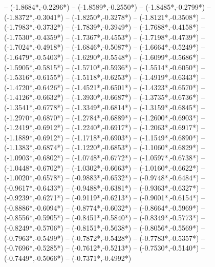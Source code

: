 {	-- ({-1.8684*\dx},{-0.2296*\dy})
	-- ({-1.8589*\dx},{-0.2550*\dy})
	-- ({-1.8485*\dx},{-0.2799*\dy})
	-- ({-1.8372*\dx},{-0.3041*\dy})
	-- ({-1.8250*\dx},{-0.3278*\dy})
	-- ({-1.8121*\dx},{-0.3508*\dy})
	-- ({-1.7983*\dx},{-0.3732*\dy})
	-- ({-1.7839*\dx},{-0.3949*\dy})
	-- ({-1.7688*\dx},{-0.4158*\dy})
	-- ({-1.7530*\dx},{-0.4359*\dy})
	-- ({-1.7367*\dx},{-0.4553*\dy})
	-- ({-1.7198*\dx},{-0.4739*\dy})
	-- ({-1.7024*\dx},{-0.4918*\dy})
	-- ({-1.6846*\dx},{-0.5087*\dy})
	-- ({-1.6664*\dx},{-0.5249*\dy})
	-- ({-1.6479*\dx},{-0.5403*\dy})
	-- ({-1.6290*\dx},{-0.5548*\dy})
	-- ({-1.6099*\dx},{-0.5686*\dy})
	-- ({-1.5905*\dx},{-0.5815*\dy})
	-- ({-1.5710*\dx},{-0.5936*\dy})
	-- ({-1.5514*\dx},{-0.6050*\dy})
	-- ({-1.5316*\dx},{-0.6155*\dy})
	-- ({-1.5118*\dx},{-0.6253*\dy})
	-- ({-1.4919*\dx},{-0.6343*\dy})
	-- ({-1.4720*\dx},{-0.6426*\dy})
	-- ({-1.4521*\dx},{-0.6501*\dy})
	-- ({-1.4323*\dx},{-0.6570*\dy})
	-- ({-1.4126*\dx},{-0.6632*\dy})
	-- ({-1.3930*\dx},{-0.6687*\dy})
	-- ({-1.3735*\dx},{-0.6736*\dy})
	-- ({-1.3541*\dx},{-0.6778*\dy})
	-- ({-1.3349*\dx},{-0.6814*\dy})
	-- ({-1.3159*\dx},{-0.6845*\dy})
	-- ({-1.2970*\dx},{-0.6870*\dy})
	-- ({-1.2784*\dx},{-0.6889*\dy})
	-- ({-1.2600*\dx},{-0.6903*\dy})
	-- ({-1.2419*\dx},{-0.6912*\dy})
	-- ({-1.2240*\dx},{-0.6917*\dy})
	-- ({-1.2063*\dx},{-0.6917*\dy})
	-- ({-1.1889*\dx},{-0.6912*\dy})
	-- ({-1.1718*\dx},{-0.6903*\dy})
	-- ({-1.1549*\dx},{-0.6890*\dy})
	-- ({-1.1383*\dx},{-0.6874*\dy})
	-- ({-1.1220*\dx},{-0.6853*\dy})
	-- ({-1.1060*\dx},{-0.6829*\dy})
	-- ({-1.0903*\dx},{-0.6802*\dy})
	-- ({-1.0748*\dx},{-0.6772*\dy})
	-- ({-1.0597*\dx},{-0.6738*\dy})
	-- ({-1.0448*\dx},{-0.6702*\dy})
	-- ({-1.0302*\dx},{-0.6663*\dy})
	-- ({-1.0160*\dx},{-0.6622*\dy})
	-- ({-1.0020*\dx},{-0.6578*\dy})
	-- ({-0.9883*\dx},{-0.6532*\dy})
	-- ({-0.9748*\dx},{-0.6484*\dy})
	-- ({-0.9617*\dx},{-0.6433*\dy})
	-- ({-0.9488*\dx},{-0.6381*\dy})
	-- ({-0.9363*\dx},{-0.6327*\dy})
	-- ({-0.9239*\dx},{-0.6271*\dy})
	-- ({-0.9119*\dx},{-0.6213*\dy})
	-- ({-0.9001*\dx},{-0.6154*\dy})
	-- ({-0.8886*\dx},{-0.6094*\dy})
	-- ({-0.8774*\dx},{-0.6032*\dy})
	-- ({-0.8664*\dx},{-0.5969*\dy})
	-- ({-0.8556*\dx},{-0.5905*\dy})
	-- ({-0.8451*\dx},{-0.5840*\dy})
	-- ({-0.8349*\dx},{-0.5773*\dy})
	-- ({-0.8249*\dx},{-0.5706*\dy})
	-- ({-0.8151*\dx},{-0.5638*\dy})
	-- ({-0.8056*\dx},{-0.5569*\dy})
	-- ({-0.7963*\dx},{-0.5499*\dy})
	-- ({-0.7872*\dx},{-0.5428*\dy})
	-- ({-0.7783*\dx},{-0.5357*\dy})
	-- ({-0.7696*\dx},{-0.5285*\dy})
	-- ({-0.7612*\dx},{-0.5213*\dy})
	-- ({-0.7530*\dx},{-0.5140*\dy})
	-- ({-0.7449*\dx},{-0.5066*\dy})
	-- ({-0.7371*\dx},{-0.4992*\dy})
}
